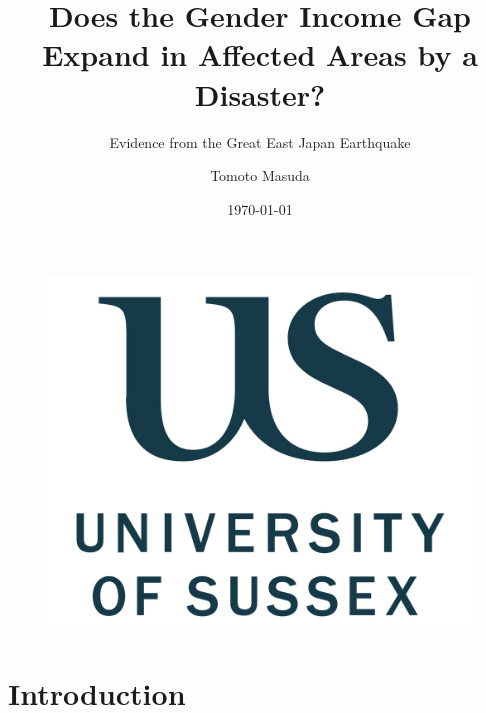 \documentclass[serif, aspectratio=169]{beamer}
\author{Tomoto Masuda}
\title{Does the Gender Income Gap Expand in Affected Areas by a Disaster?}
\subtitle{Evidence from the Great East Japan Earthquake}
\institute{
    Department of Economics, Business School \\
    University of Sussex
}
\date{\small \today}
\begin{document}
\begin{frame}
    \titlepage
    \vspace*{-0.6cm}
    \begin{figure}[htpb]
        \begin{center}
            \includegraphics[keepaspectratio, scale=0.03]{logo_UoS.jpeg}
        \end{center}
    \end{figure}
\end{frame}


\section{Introduction}
\end{document}
